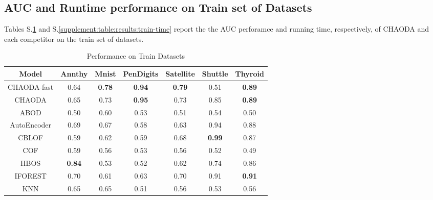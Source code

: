 \documentclass{article}
\begin{document}
\subsection{AUC and Runtime performance on Train set of Datasets}

Tables S.\ref{supplement:table:results:train-performance} and S.\ref{supplement:table:results:train-time} report the  the AUC perforamce and running time, respectively, of CHAODA and each competitor on the train set of datasets.

\begin{table}[!t]
\renewcommand{\arraystretch}{1.25}
\caption{Performance on Train Datasets}
\label{supplement:table:results:train-performance}
\vskip 0.15in
\begin{center}
\begin{small}
\begin{tabular}{|c|c|c|c|c|c|c|}
\hline
\textbf{Model} & \textbf{Annthy} & \textbf{Mnist} & \textbf{PenDigits} & \textbf{Satellite} & \textbf{Shuttle} & \textbf{Thyroid} \\
\hline
CHAODA-fast &                0.64 &  \textbf{0.78} &      \textbf{0.94} &      \textbf{0.79} &             0.51 &    \textbf{0.89} \\
\hline
CHAODA &                0.65 &           0.73 &      \textbf{0.95} &               0.73 &             0.85 &    \textbf{0.89} \\
\hline
ABOD &                0.50 &           0.60 &               0.53 &               0.51 &             0.54 &             0.50 \\
\hline
AutoEncoder &                0.69 &           0.67 &               0.58 &               0.63 &             0.94 &             0.88 \\
\hline
CBLOF &                0.59 &           0.62 &               0.59 &               0.68 &    \textbf{0.99} &             0.87 \\
\hline
COF &                0.59 &           0.56 &               0.53 &               0.56 &             0.52 &             0.49 \\
\hline
HBOS &       \textbf{0.84} &           0.53 &               0.52 &               0.62 &             0.74 &             0.86 \\
\hline
IFOREST &                0.70 &           0.61 &               0.63 &               0.70 &             0.91 &    \textbf{0.91} \\
\hline
KNN &                0.65 &           0.65 &               0.51 &               0.56 &             0.53 &             0.56 \\

\end{tabular}
\end{small}
\end{center}
\end{table}
\end{document}
